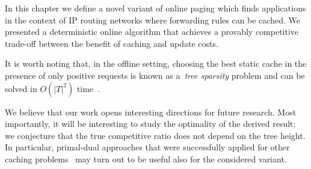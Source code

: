 In this chapter we define a novel variant of online paging which finds
applications in the context of IP routing networks where forwarding rules can
be cached. We presented a deterministic online algorithm that achieves a
provably competitive trade-off between the benefit of caching and update costs.

It is worth noting that, in the offline setting, choosing the best static cache 
in the presence of only positive requests is known as a~\emph{tree sparsity}
problem and can be solved in $O(|T|^2)$ time~\cite{tree-sparsity}.

We believe that our work opens interesting directions for future research.
Most importantly, it will be interesting to study the optimality of the
derived result; we conjecture that the true competitive ratio does not 
depend on the tree height. In particular, primal-dual approaches that were
successfully applied for other caching
problems~\cite{young-paging-greedy-dual,generalized-caching-optimal,generalized-caching-bansal} may turn out to be useful also for the considered variant. 



